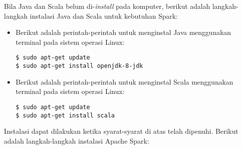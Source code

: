 Bila Java dan Scala belum di-\textit{install} pada komputer, berikut adalah langkah-langkah instalasi Java dan Scala untuk kebutuhan Spark:

\begin{itemize}

\item Berikut adalah perintah-perintah untuk menginstal Java menggunakan terminal pada sistem operasi Linux:

\begin{verbatim}
$ sudo apt-get update
$ sudo apt-get install openjdk-8-jdk
\end{verbatim}

\item Berikut adalah perintah-perintah untuk menginstal Scala menggunakan terminal pada sistem operasi Linux:

\begin{verbatim}
$ sudo apt-get update
$ sudo apt-get install scala
\end{verbatim}

\end{itemize}


Instalasi dapat dilakukan ketika syarat-syarat di atas telah dipenuhi. Berikut adalah langkah-langkah instalasi Apache Spark:

